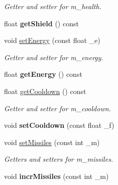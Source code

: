 \begin{DoxyCompactItemize}
\begin{DoxyCompactList}\small\item\em Getter and setter for m\-\_\-health. \end{DoxyCompactList}\item 
\hypertarget{classship_a090f2e29fbd4c9467ce85cb7d328a0b8}{float {\bfseries get\-Shield} () const }\label{classship_a090f2e29fbd4c9467ce85cb7d328a0b8}

\item 
\hypertarget{classship_a8eba58ae69aa02a01cf1d01a143b7a78}{void \hyperlink{classship_a8eba58ae69aa02a01cf1d01a143b7a78}{set\-Energy} (const float \-\_\-e)}\label{classship_a8eba58ae69aa02a01cf1d01a143b7a78}

\begin{DoxyCompactList}\small\item\em Getter and setter for m\-\_\-energy. \end{DoxyCompactList}\item 
\hypertarget{classship_a5657cf00d4e80b03027e149c61624f54}{float {\bfseries get\-Energy} () const }\label{classship_a5657cf00d4e80b03027e149c61624f54}

\item 
\hypertarget{classship_a9d4cba0939f03d27c9f85d2ee6ca6d5f}{float \hyperlink{classship_a9d4cba0939f03d27c9f85d2ee6ca6d5f}{get\-Cooldown} () const }\label{classship_a9d4cba0939f03d27c9f85d2ee6ca6d5f}

\begin{DoxyCompactList}\small\item\em Getter and setter for m\-\_\-cooldown. \end{DoxyCompactList}\item 
\hypertarget{classship_af6a10864d7d030e6a31ff1362cab790b}{void {\bfseries set\-Cooldown} (const float \-\_\-f)}\label{classship_af6a10864d7d030e6a31ff1362cab790b}

\item 
\hypertarget{classship_a6a4075497f5bede29ad9e9e5cb339238}{void \hyperlink{classship_a6a4075497f5bede29ad9e9e5cb339238}{set\-Missiles} (const int \-\_\-m)}\label{classship_a6a4075497f5bede29ad9e9e5cb339238}

\begin{DoxyCompactList}\small\item\em Getters and setters for m\-\_\-missiles. \end{DoxyCompactList}\item 
\hypertarget{classship_af4263788f57fca762ce8e5b2972bcaa5}{void {\bfseries incr\-Missiles} (const int \-\_\-m)}\label{classship_af4263788f57fca762ce8e5b2972bcaa5}


\end{DoxyCompactItemize}
